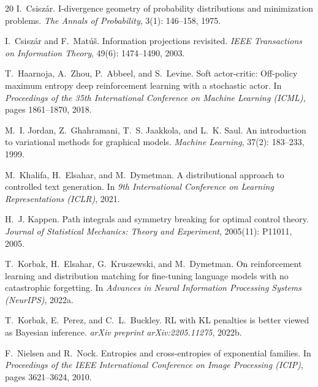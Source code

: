 \documentclass[11pt, a4paper, 
onecolumn, 
showabstract]{naverlabseurope-onecol-flex}
\theoremstyle{definition}
\theoremstyle{remark}
\begin{document}
\begin{thebibliography}{20}
I.~Csisz{\'a}r.
I-divergence geometry of probability distributions and minimization problems.
\emph{The Annals of Probability}, 3(1): 146--158, 1975.

I.~Csisz{\'a}r and F.~Mat{\'u}\v{s}.
Information projections revisited.
\emph{IEEE Transactions on Information Theory}, 49(6): 1474--1490, 2003.


T.~Haarnoja, A.~Zhou, P.~Abbeel, and S.~Levine.
Soft actor-critic: Off-policy maximum entropy deep reinforcement learning with a stochastic actor.
In \emph{Proceedings of the 35th International Conference on Machine Learning (ICML)}, pages 1861--1870, 2018.


M.~I. Jordan, Z.~Ghahramani, T.~S. Jaakkola, and L.~K. Saul.
An introduction to variational methods for graphical models.
\emph{Machine Learning}, 37(2): 183--233, 1999.

M.~Khalifa, H.~Elsahar, and M.~Dymetman.
A distributional approach to controlled text generation.
In \emph{9th International Conference on Learning Representations (ICLR)}, 2021.

H.~J. Kappen.
Path integrals and symmetry breaking for optimal control theory.
\emph{Journal of Statistical Mechanics: Theory and Experiment}, 2005(11): P11011, 2005.

T.~Korbak, H.~Elsahar, G.~Kruszewski, and M.~Dymetman.
On reinforcement learning and distribution matching for fine-tuning language models with no catastrophic forgetting.
In \emph{Advances in Neural Information Processing Systems (NeurIPS)}, 2022a.

T.~Korbak, E.~Perez, and C.~L.~Buckley.
{RL} with {KL} penalties is better viewed as {Bayesian} inference.
\emph{arXiv preprint arXiv:2205.11275}, 2022b.

F.~Nielsen and R.~Nock.
Entropies and cross-entropies of exponential families.
In \emph{Proceedings of the IEEE International Conference on Image Processing (ICIP)}, pages 3621--3624, 2010.


\end{thebibliography}
\end{document}
